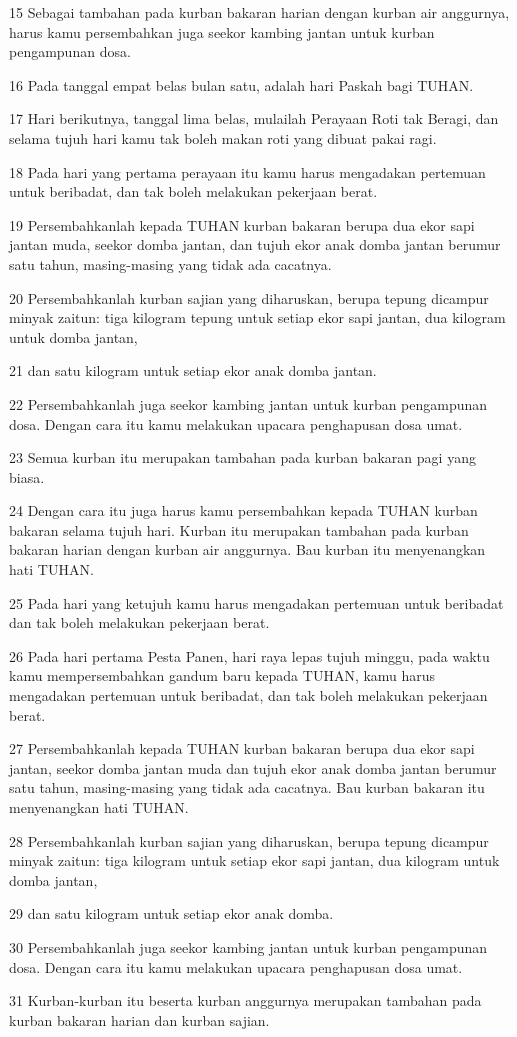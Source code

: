 \par 15 Sebagai tambahan pada kurban bakaran harian dengan kurban air anggurnya, harus kamu persembahkan juga seekor kambing jantan untuk kurban pengampunan dosa.
\par 16 Pada tanggal empat belas bulan satu, adalah hari Paskah bagi TUHAN.
\par 17 Hari berikutnya, tanggal lima belas, mulailah Perayaan Roti tak Beragi, dan selama tujuh hari kamu tak boleh makan roti yang dibuat pakai ragi.
\par 18 Pada hari yang pertama perayaan itu kamu harus mengadakan pertemuan untuk beribadat, dan tak boleh melakukan pekerjaan berat.
\par 19 Persembahkanlah kepada TUHAN kurban bakaran berupa dua ekor sapi jantan muda, seekor domba jantan, dan tujuh ekor anak domba jantan berumur satu tahun, masing-masing yang tidak ada cacatnya.
\par 20 Persembahkanlah kurban sajian yang diharuskan, berupa tepung dicampur minyak zaitun: tiga kilogram tepung untuk setiap ekor sapi jantan, dua kilogram untuk domba jantan,
\par 21 dan satu kilogram untuk setiap ekor anak domba jantan.
\par 22 Persembahkanlah juga seekor kambing jantan untuk kurban pengampunan dosa. Dengan cara itu kamu melakukan upacara penghapusan dosa umat.
\par 23 Semua kurban itu merupakan tambahan pada kurban bakaran pagi yang biasa.
\par 24 Dengan cara itu juga harus kamu persembahkan kepada TUHAN kurban bakaran selama tujuh hari. Kurban itu merupakan tambahan pada kurban bakaran harian dengan kurban air anggurnya. Bau kurban itu menyenangkan hati TUHAN.
\par 25 Pada hari yang ketujuh kamu harus mengadakan pertemuan untuk beribadat dan tak boleh melakukan pekerjaan berat.
\par 26 Pada hari pertama Pesta Panen, hari raya lepas tujuh minggu, pada waktu kamu mempersembahkan gandum baru kepada TUHAN, kamu harus mengadakan pertemuan untuk beribadat, dan tak boleh melakukan pekerjaan berat.
\par 27 Persembahkanlah kepada TUHAN kurban bakaran berupa dua ekor sapi jantan, seekor domba jantan muda dan tujuh ekor anak domba jantan berumur satu tahun, masing-masing yang tidak ada cacatnya. Bau kurban bakaran itu menyenangkan hati TUHAN.
\par 28 Persembahkanlah kurban sajian yang diharuskan, berupa tepung dicampur minyak zaitun: tiga kilogram untuk setiap ekor sapi jantan, dua kilogram untuk domba jantan,
\par 29 dan satu kilogram untuk setiap ekor anak domba.
\par 30 Persembahkanlah juga seekor kambing jantan untuk kurban pengampunan dosa. Dengan cara itu kamu melakukan upacara penghapusan dosa umat.
\par 31 Kurban-kurban itu beserta kurban anggurnya merupakan tambahan pada kurban bakaran harian dan kurban sajian.

